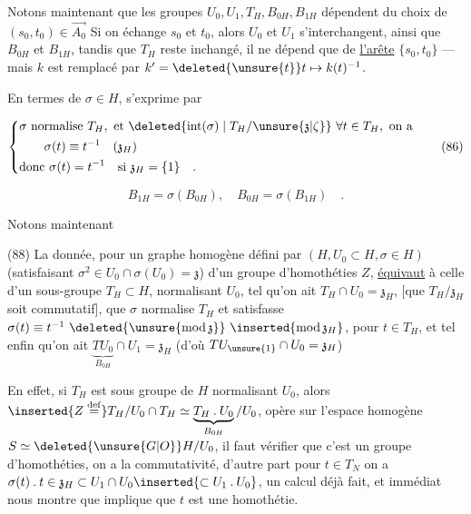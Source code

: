 Notons maintenant que les groupes  $U_0,U_1,T_H,B_{0H},B_{1H}$ dépendent du choix de $(s_0,t_0)\in\overrightarrow{A_0}$ Si on échange $s_0$ et $t_0$, alors $U_0$ et $U_1$ s'interchangent, ainsi que $B_{0H}$ et $B_{1H}$, tandis que $T_H$ reste inchangé, il ne dépend que de \uline{l'arête} $\{s_0,t_0\}$ --- mais $k$ est remplacé par $k'=\deleted{\unsure{t}}t\mapsto k(t)^{-1}$.

En termes de $\sigma\in H$,  s'exprime par

\[
\left\{\begin{aligned}
&\sigma\text{ normalise }T_H,\text{ et }\deleted{\mathrm{int}(\sigma)\mid T_H/\unsure{\mathfrak z|\zeta}}\ \forall t\in T_H,\text{ on a}\\
&\qquad\sigma(t)\equiv t^{-1}\quad(\mathfrak z_H)\\
&\text{donc }\sigma(t)=t^{-1}\quad\text{si }\mathfrak z_H=\{1\}\quad.
\end{aligned}\right.
\tag*{(86)}
\]

\[
B_{1H}=\sigma(B_{0H}),\quad B_{0H}=\sigma(B_{1H})\quad.
\tag*{(87)}
\]

Notons maintenant

(88) La donnée,  pour un graphe homogène défini par $(H,U_0\subset H,\sigma\in H)$ (satisfaisant $\sigma^2\in U_0\cap\sigma(U_0)=\mathfrak z$) d'un groupe d'homothéties $Z$,  \uline{équivaut} à celle d'un sous-groupe $T_H\subset H$, normalisant $U_0$, tel qu'on ait $T_H\cap U_0=\mathfrak z_H$, $[$que $T_H/\mathfrak z_H$ soit commutatif$]$,  que $\sigma$ normalise $T_H$ et  satisfasse $\sigma(t)\equiv t^{-1}\ \deleted{\unsure{\mathrm{mod}\,\mathfrak z}}\ \inserted{\mathrm{mod}\,\mathfrak z_H}$, pour $t\in T_H$, et tel enfin qu'on ait $\underbrace{TU_0}_{B_{0H}}\cap U_1=\mathfrak z_H$ (d'où   $TU_{\unsure{1}}\cap U_0=\mathfrak z_H$)




En effet, si $T_H$ est  sous groupe de $H$ normalisant $U_0$, alors $\inserted{Z\overset{\mathrm{def}}{=}}T_H/U_0\cap T_H\simeq\underbrace{T_H\mathbin{.}U_0}_{B_{0H}}/U_0$, opère  sur l'espace homogène $S\simeq\deleted{\unsure{G|O}}H/U_0$, il faut vérifier que c'est un groupe d'homothéties, on a  la commutativité, d'autre part pour $t\in T_{N}$ on a $\sigma(t)\mathbin{.}t\in\mathfrak z_H\subset U_{1}\cap U_0\inserted{\subset U_1\mathbin{.}U_0}$, un calcul déjà fait, et immédiat nous montre que  implique que $t$ est une homothétie. 

